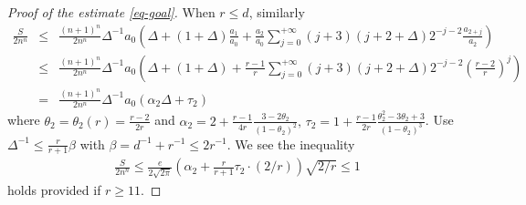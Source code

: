 \documentclass[12pt]{amsart}
\theoremstyle{definition}
\begin{document}
\begin{proof}[Proof of the estimate \eqref{eq-goal}]
When $r\leq d$, similarly
\begin{eqnarray*}
\frac{S}{2n^n}&\leq& \frac{(n+1)^n}{2n^n}\Delta^{-1}a_0\left(\Delta+(1+\Delta)\frac{a_1}{a_0}+\frac{a_2}{a_0}\sum_{j=0}^{+\infty}(j+3)(j+2+\Delta)2^{-j-2}\frac{a_{2+j}}{a_2} \right)\\
   &\leq& \frac{(n+1)^n}{2n^n}\Delta^{-1}a_0\left(\Delta+(1+\Delta) +\frac{r-1}{r}\sum_{j=0}^{+\infty}(j+3)(j+2+\Delta)2^{-j-2}\left(\frac{r-2}{r} \right)^j\right) \\
     &=&\frac{(n+1)^n}{2n^n}\Delta^{-1}a_0\left(\alpha_2 \Delta+\tau_2\right)
\end{eqnarray*}
where $\theta_2=\theta_2(r)=\frac{r-2}{2r}$ and $\alpha_2=2+\frac{r-1}{4r}\frac{3-2\theta_2}{(1-\theta_2)^2},\, \tau_2=1+\frac{r-1}{2r}\frac{\theta_2^2-3\theta_2+3}{(1-\theta_2)^3}$. 
Use $\Delta^{-1}\le \frac{r}{r+1}\beta$ with $\beta=d^{-1}+r^{-1}\le 2r^{-1}$. We see the inequality
\begin{eqnarray*}
    \frac{S}{2n^n}\leq\frac{e}{2\sqrt{2\pi}}\left(\alpha_2 +\frac{r}{r+1}\tau_2 \cdot (2/r) \right)\sqrt{2/r}\leq1
\end{eqnarray*}
 holds provided if $r\ge 11$. 



\end{proof}
\end{document}
